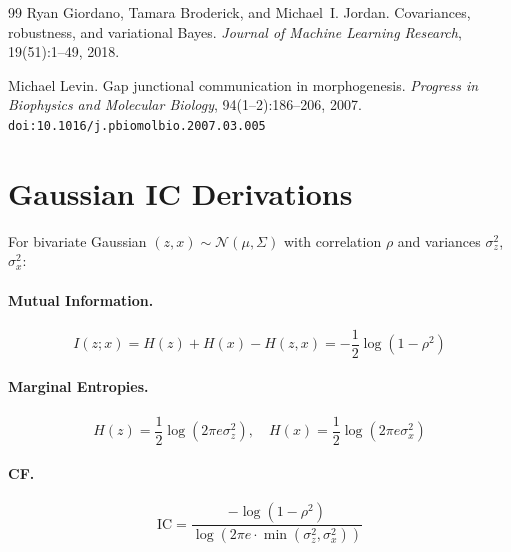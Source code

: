 \documentclass[10pt]{article} %
\theoremstyle{plain}
\theoremstyle{definition}
\newcommand{\IC}{\mathrm{IC}}  %
\newcommand{\MI}{I}
\newcommand{\Ent}{H}
\begin{document}
\begin{thebibliography}{99}
Ryan Giordano, Tamara Broderick, and Michael~I. Jordan.
\newblock Covariances, robustness, and variational {B}ayes.
\newblock \emph{Journal of Machine Learning Research}, 19(51):1--49, 2018.

Michael Levin.
\newblock Gap junctional communication in morphogenesis.
\newblock \emph{Progress in Biophysics and Molecular Biology}, 94(1--2):186--206, 2007.
\newblock \texttt{doi:10.1016/j.pbiomolbio.2007.03.005}

\end{thebibliography}
\appendix

\section{Gaussian IC Derivations}
\label{app:gaussian}

For bivariate Gaussian $(z, x) \sim \mathcal{N}(\mu, \Sigma)$ with correlation $\rho$ and variances $\sigma_z^2$, $\sigma_x^2$:

\paragraph{Mutual Information.}
\begin{equation}
\MI(z;x) = \Ent(z) + \Ent(x) - \Ent(z,x) = -\frac{1}{2}\log(1 - \rho^2)
\end{equation}

\paragraph{Marginal Entropies.}
\begin{equation}
\Ent(z) = \frac{1}{2}\log(2\pi e \sigma_z^2), \quad \Ent(x) = \frac{1}{2}\log(2\pi e \sigma_x^2)
\end{equation}

\paragraph{CF.}
\begin{equation}
\IC = \frac{-\log(1-\rho^2)}{\log(2\pi e \cdot \min(\sigma_z^2, \sigma_x^2))}
\end{equation}
\end{document}
